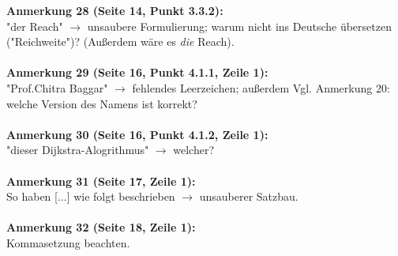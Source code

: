 \documentclass[a4paper,12pt]{book}
\begin{document}
\noindent
\textbf{Anmerkung 28 (Seite 14, Punkt 3.3.2):}\\
"der Reach" $\rightarrow$ unsaubere Formulierung; warum nicht ins Deutsche übersetzen ("Reichweite")? (Außerdem wäre es \emph{die} Reach). \\
\\

\noindent
\textbf{Anmerkung 29 (Seite 16, Punkt 4.1.1, Zeile 1):}\\
"Prof.Chitra Baggar" $\rightarrow$ fehlendes Leerzeichen; außerdem Vgl. Anmerkung 20: welche Version des Namens ist korrekt?\\
\\

\noindent
\textbf{Anmerkung 30 (Seite 16, Punkt 4.1.2, Zeile 1):}\\
"dieser Dijkstra-Alogrithmus" $\rightarrow$ welcher? \\
\\

\noindent
\textbf{Anmerkung 31 (Seite 17, Zeile 1):}\\
So haben [...] wie folgt beschrieben $\rightarrow$ unsauberer Satzbau. \\
\\

\noindent
\textbf{Anmerkung 32 (Seite 18, Zeile 1):}\\
Kommasetzung beachten. \\
\\
\end{document}
